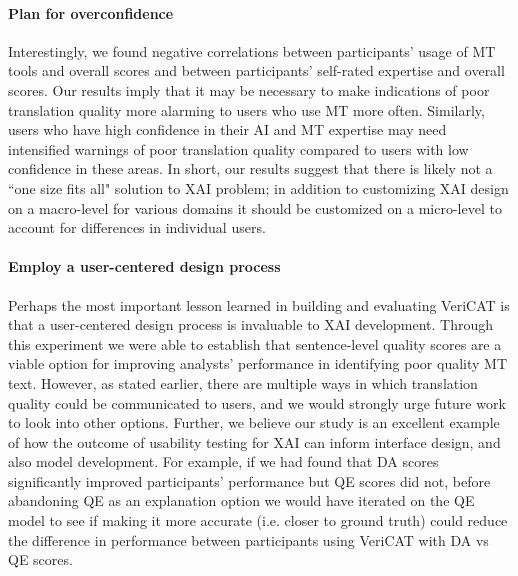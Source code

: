 \paragraph{\textbf{Plan for overconfidence}} Interestingly, we found negative correlations between participants' usage of MT tools and overall scores and between participants' self-rated expertise and overall scores. Our results imply that it may be necessary to make indications of poor translation quality more alarming to users who use MT more often. Similarly, users who have high confidence in their AI and MT expertise may need intensified warnings of poor translation quality compared to users with low confidence in these areas. In short, our results suggest that there is likely not a ``one size fits all" solution to XAI problem; in addition to customizing XAI design on a macro-level for various domains it should be customized on a micro-level to account for differences in individual users.   

\paragraph{\textbf{Employ a user-centered design process}} Perhaps the most important lesson learned in building and evaluating VeriCAT is that a user-centered design process is invaluable to XAI development. Through this experiment we were able to establish that sentence-level quality scores are a viable option for improving analysts' performance in identifying poor quality MT text. However, as stated earlier, there are multiple ways in which translation quality could be communicated to users, and we would strongly urge future work to look into other options. Further, we believe our study is an excellent example of how the outcome of usability testing for XAI can inform interface design, and also model development. For example, if we had found that DA scores significantly improved participants' performance but QE scores did not, before abandoning QE as an explanation option we would have iterated on the QE model to see if making it more accurate (i.e. closer to ground truth) could reduce the difference in performance between participants using VeriCAT with DA vs QE scores.     



